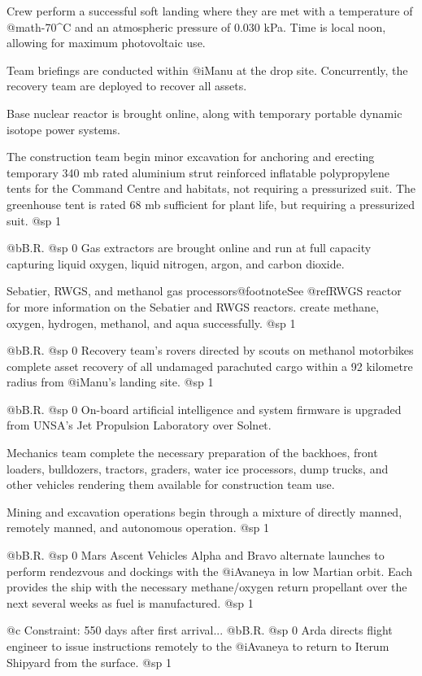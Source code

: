Crew perform a successful soft landing where they are met with a temperature of @math{-70^{\circ}}C and an atmospheric pressure of 0.030 kPa. Time is local noon, allowing for maximum photovoltaic use.

Team briefings are conducted within @i{Manu} at the drop site. Concurrently, the recovery team are deployed to recover all assets.

Base nuclear reactor is brought online, along with temporary portable dynamic isotope power systems.

The construction team begin minor excavation for anchoring and erecting temporary 340 mb rated aluminium strut reinforced inflatable polypropylene tents for the Command Centre and habitats, not requiring a pressurized suit. The greenhouse tent is rated 68 mb sufficient for plant life, but requiring a pressurized suit.
@sp 1

@b{B.R.}
@sp 0
Gas extractors are brought online and run at full capacity capturing liquid oxygen, liquid nitrogen, argon, and carbon dioxide. 

Sebatier, RWGS, and methanol gas processors@footnote{See @ref{RWGS reactor} for more information on the Sebatier and RWGS reactors.} create methane, oxygen, hydrogen, methanol, and aqua successfully.
@sp 1

@b{B.R.}
@sp 0
Recovery team's rovers directed by scouts on methanol motorbikes complete asset recovery of all undamaged parachuted cargo within a 92 kilometre radius from @i{Manu's} landing site.
@sp 1

@b{B.R.}
@sp 0
On-board artificial intelligence and system firmware is upgraded from UNSA's Jet Propulsion Laboratory over Solnet.

Mechanics team complete the necessary preparation of the backhoes, front loaders, bulldozers, tractors, graders, water ice processors, dump trucks, and other vehicles rendering them available for construction team use.

Mining and excavation operations begin through a mixture of directly manned, remotely manned, and autonomous operation.
@sp 1

@b{B.R.}
@sp 0
Mars Ascent Vehicles Alpha and Bravo alternate launches to perform rendezvous and dockings with the @i{Avaneya} in low Martian orbit. Each provides the ship with the necessary methane/oxygen return propellant over the next several weeks as fuel is manufactured.
@sp 1

@c Constraint: 550 days after first arrival...
@b{B.R.}
@sp 0
Arda directs flight engineer to issue instructions remotely to the @i{Avaneya} to return to Iterum Shipyard from the surface.
@sp 1


